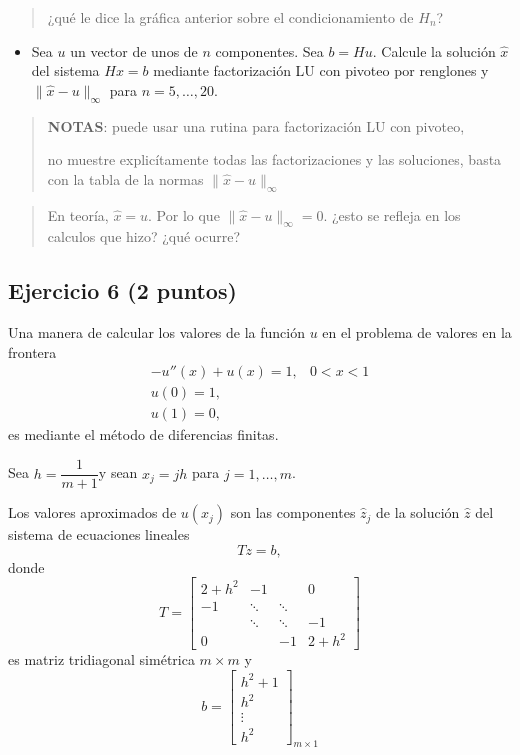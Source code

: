 \documentclass[11pt]{article}
\providecommand{\tightlist}{%
      \setlength{\itemsep}{0pt}\setlength{\parskip}{0pt}}
\begin{document}
    \begin{quote}
 ¿qué le dice la gráfica anterior sobre el condicionamiento de \(H_n\)?
\end{quote}

    \begin{itemize}
\tightlist
\item
   Sea \(u\) un vector de unos de \(n\) componentes. Sea \(b=Hu\).
  Calcule la solución \(\widehat x\) del sistema \(Hx=b\) mediante
  factorización LU con pivoteo por renglones y
  \(\|\widehat x-u\|_{\infty}\) para \(n=5,\dots,20\). 
\end{itemize}

\begin{quote}
\textbf{NOTAS}: 
 puede usar una rutina para factorización LU con pivoteo, 
 
 no muestre explicítamente todas las factorizaciones y las soluciones, 
 basta con la tabla de la normas \(\|\widehat x-u\|_{\infty}\)
\end{quote}

    \begin{quote}
 En teoría, \(\widehat x=u\). Por lo que
\(\|\widehat x-u\|_{\infty}=0\). ¿esto se refleja en los calculos que
hizo? ¿qué ocurre?
\end{quote}

    \subsection{Ejercicio 6 (2 puntos)}\label{ejercicio-6}

 Una manera de calcular los valores de la función \(u\) en el problema
de valores en la frontera \[\begin{array}{rl}
    -u''(x)+u(x) =1, & 0<x<1 \\ u(0)= 1, & \\ u(1) =0,  
    \end{array}\] es mediante el método de diferencias finitas. 
    
    Sea
\(h=\dfrac{1}{m+1}\)y sean \(x_j=jh\) para \(j=1,\dots,m\). 

Los valores
aproximados de \(u(x_j)\) son las componentes \(\widehat z_j\) de la
solución \(\widehat z\) del sistema de ecuaciones lineales \[Tz=b,\]
donde \[ T =
  \begin{bmatrix}
  2+h^2 & -1 & & 0 \\ -1 & \ddots & \ddots & \\ & \ddots & \ddots & -1 \\ 0 & & -1 & 2+h^2
  \end{bmatrix}\] es matriz tridiagonal simétrica \(m\times m\) y \[b=
\begin{bmatrix}
 h^2 +1 \\ h^2 \\ \vdots \\ h^2
\end{bmatrix}_{m\times 1}
\]\\
\end{document}
